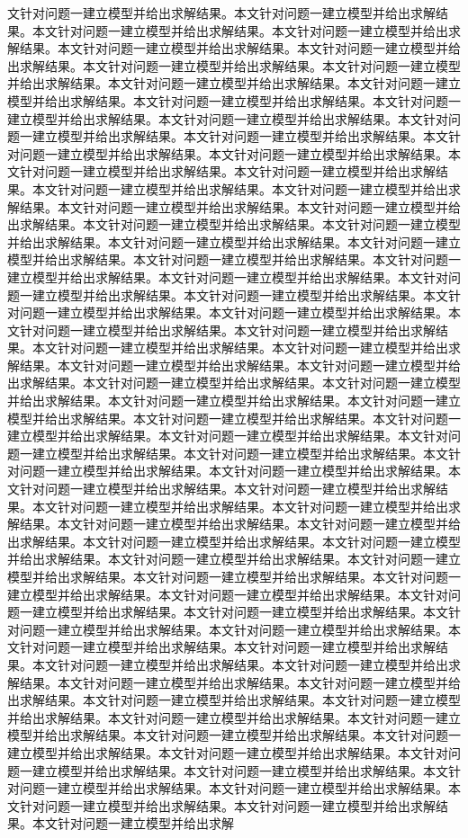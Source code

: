 文针对问题一建立模型并给出求解结果。本文针对问题一建立模型并给出求解结果。本文针对问题一建立模型并给出求解结果。本文针对问题一建立模型并给出求解结果。本文针对问题一建立模型并给出求解结果。本文针对问题一建立模型并给出求解结果。本文针对问题一建立模型并给出求解结果。本文针对问题一建立模型并给出求解结果。本文针对问题一建立模型并给出求解结果。本文针对问题一建立模型并给出求解结果。本文针对问题一建立模型并给出求解结果。本文针对问题一建立模型并给出求解结果。本文针对问题一建立模型并给出求解结果。本文针对问题一建立模型并给出求解结果。本文针对问题一建立模型并给出求解结果。本文针对问题一建立模型并给出求解结果。本文针对问题一建立模型并给出求解结果。本文针对问题一建立模型并给出求解结果。本文针对问题一建立模型并给出求解结果。本文针对问题一建立模型并给出求解结果。本文针对问题一建立模型并给出求解结果。本文针对问题一建立模型并给出求解结果。本文针对问题一建立模型并给出求解结果。本文针对问题一建立模型并给出求解结果。本文针对问题一建立模型并给出求解结果。本文针对问题一建立模型并给出求解结果。本文针对问题一建立模型并给出求解结果。本文针对问题一建立模型并给出求解结果。本文针对问题一建立模型并给出求解结果。本文针对问题一建立模型并给出求解结果。本文针对问题一建立模型并给出求解结果。本文针对问题一建立模型并给出求解结果。本文针对问题一建立模型并给出求解结果。本文针对问题一建立模型并给出求解结果。本文针对问题一建立模型并给出求解结果。本文针对问题一建立模型并给出求解结果。本文针对问题一建立模型并给出求解结果。本文针对问题一建立模型并给出求解结果。本文针对问题一建立模型并给出求解结果。本文针对问题一建立模型并给出求解结果。本文针对问题一建立模型并给出求解结果。本文针对问题一建立模型并给出求解结果。本文针对问题一建立模型并给出求解结果。本文针对问题一建立模型并给出求解结果。本文针对问题一建立模型并给出求解结果。本文针对问题一建立模型并给出求解结果。本文针对问题一建立模型并给出求解结果。本文针对问题一建立模型并给出求解结果。本文针对问题一建立模型并给出求解结果。本文针对问题一建立模型并给出求解结果。本文针对问题一建立模型并给出求解结果。本文针对问题一建立模型并给出求解结果。本文针对问题一建立模型并给出求解结果。本文针对问题一建立模型并给出求解结果。本文针对问题一建立模型并给出求解结果。本文针对问题一建立模型并给出求解结果。本文针对问题一建立模型并给出求解结果。本文针对问题一建立模型并给出求解结果。本文针对问题一建立模型并给出求解结果。本文针对问题一建立模型并给出求解结果。本文针对问题一建立模型并给出求解结果。本文针对问题一建立模型并给出求解结果。本文针对问题一建立模型并给出求解结果。本文针对问题一建立模型并给出求解结果。本文针对问题一建立模型并给出求解结果。本文针对问题一建立模型并给出求解结果。本文针对问题一建立模型并给出求解结果。本文针对问题一建立模型并给出求解结果。本文针对问题一建立模型并给出求解结果。本文针对问题一建立模型并给出求解结果。本文针对问题一建立模型并给出求解结果。本文针对问题一建立模型并给出求解结果。本文针对问题一建立模型并给出求解结果。本文针对问题一建立模型并给出求解结果。本文针对问题一建立模型并给出求解结果。本文针对问题一建立模型并给出求解结果。本文针对问题一建立模型并给出求解结果。本文针对问题一建立模型并给出求解结果。本文针对问题一建立模型并给出求解结果。本文针对问题一建立模型并给出求解结果。本文针对问题一建立模型并给出求解结果。本文针对问题一建立模型并给出求解结果。本文针对问题一建立模型并给出求解结果。本文针对问题一建立模型并给出求解结果。本文针对问题一建立模型并给出求解结果。本文针对问题一建立模型并给出求解结果。本文针对问题一建立模型并给出求解结果。本文针对问题一建立模型并给出求解